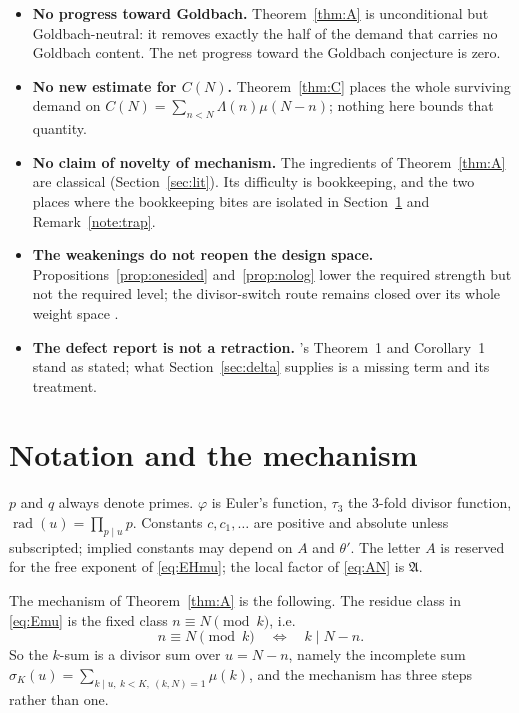 \documentclass[11pt,a4paper]{article}
\theoremstyle{plain}
\theoremstyle{definition}
\theoremstyle{remark}
\newcommand{\AAA}{\mathfrak{A}}
\DeclareMathOperator{\rad}{rad}
\begin{document}
\begin{itemize}
\item \textbf{No progress toward Goldbach.} Theorem~\ref{thm:A} is
unconditional but Goldbach-neutral: it removes exactly the half of the
demand that carries no Goldbach content. The net progress toward the
Goldbach conjecture is zero.

\item \textbf{No new estimate for $C(N)$.} Theorem~\ref{thm:C} places
the whole surviving demand on
$C(N)=\sum_{n<N}\Lambda(n)\mu(N-n)$; nothing here bounds that quantity.

\item \textbf{No claim of novelty of mechanism.} The ingredients of
Theorem~\ref{thm:A} are classical (Section~\ref{sec:lit}). Its
difficulty is bookkeeping, and the two places where the bookkeeping
bites are isolated in Section~\ref{sec:mechanism} and
Remark~\ref{note:trap}.

\item \textbf{The weakenings do not reopen the design space.}
Propositions~\ref{prop:onesided} and~\ref{prop:nolog} lower the
required strength but not the required level; the divisor-switch route
remains closed over its whole weight space \cite{P2}.

\item \textbf{The defect report is not a retraction.} \cite{HL}'s
Theorem~1 and Corollary~1 stand as stated; what
Section~\ref{sec:delta} supplies is a missing term and its treatment.
\end{itemize}

\section{Notation and the mechanism}\label{sec:mechanism}

$p$ and $q$ always denote primes. $\varphi$ is Euler's function,
$\tau_3$ the $3$-fold divisor function, $\rad(u)=\prod_{p\mid u}p$.
Constants $c,c_1,\dots$ are positive and absolute unless subscripted;
implied constants may depend on $A$ and $\theta'$. The letter $A$ is
reserved for the free exponent of \eqref{eq:EHmu}; the local factor of
\eqref{eq:AN} is $\AAA$.

The mechanism of Theorem~\ref{thm:A} is the following. The residue
class in \eqref{eq:Emu} is the fixed class $n\equiv N\pmod k$, i.e.
\[
  n\equiv N\pmod{k}\quad\Longleftrightarrow\quad k\mid N-n .
\]
So the $k$-sum is a divisor sum over $u=N-n$, namely the incomplete
sum $\sigma_K(u)=\sum_{k\mid u,\ k<K,\ (k,N)=1}\mu(k)$, and the
mechanism has three steps rather than one.
\end{document}
